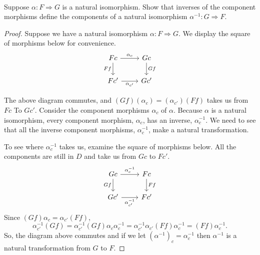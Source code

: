 \documentclass[../../main]{subfiles}
\begin{document}
\paragraph{}
\begin{exercise}
	Suppose $\alpha: F \Rightarrow G$ is a natural isomorphism. Show that inverses
	of the component morphisms define the components of a natural isomorphism
	$\alpha^{-1}: G \Rightarrow F$.
\end{exercise}

\begin{proof}
	Suppose we have a natural isomorphism $\alpha: F \Rightarrow G$. We display
	the square of morphisms below for convenience.
	\[\begin{tikzcd}
			Fc \arrow{r}{\alpha_{c}} \arrow[swap]{d}{Ff}  &
			Gc \arrow{d}{Gf} \\
			Fc' \arrow[swap]{r}{\alpha_{c'}} &
			Gc'
	\end{tikzcd}\]

	The above diagram commutes, and $(Gf)(\alpha_{c})=(\alpha_{c'})(Ff)$ takes
	us from $Fc$ To $Gc'$. Consider the component morphisms $\alpha_{c}$ of
	$\alpha$. Because $\alpha$ is a natural isomorphism, every component
	morphism, $\alpha_{c}$, has an inverse,  $\alpha_{c}^{-1}$. We need to see
	that all the inverse component morphisms, $\alpha_{c}^{-1}$, make a natural
	transformation.

	To see where $\alpha_{c}^{-1}$ takes us, examine the square of morphisms
	below. All the components are still in $D$ and take us from $Gc$ to $Fc'$.
	\[\begin{tikzcd}
			Gc \arrow{r}{\alpha_{c}^{-1}} \arrow[swap]{d}{Gf}  &
			Fc \arrow{d}{Ff} \\
			Gc' \arrow[swap]{r}{\alpha_{c'}^{-1}} &
			Fc'
	\end{tikzcd}\]
	Since $(Gf)\alpha_{c}=\alpha_{c'}(Ff)$,
	\[\alpha_{c'}^{-1}(Gf)=\alpha_{c'}^{-1}(Gf)\alpha_c\alpha_c^{-1}=
	\alpha_{c'}^{-1}\alpha_{c'}(Ff)\alpha_c^{-1}=(Ff)\alpha_c^{-1}.\]
	So, the diagram above commutes and if we let $(\alpha^{-1})_c=\alpha_c^{-1}$
	then $\alpha^{-1}$ is a natural transformation from $G$ to $F$.
\end{proof}
\end{document}
